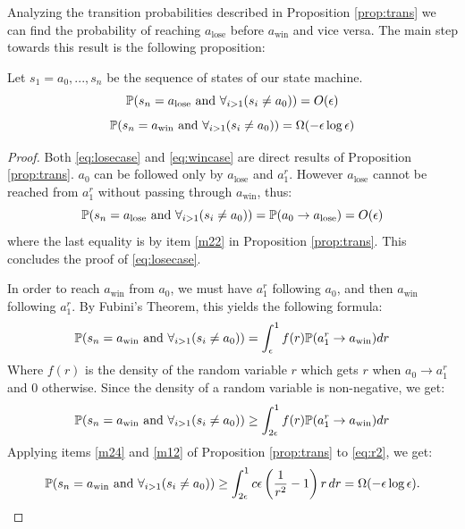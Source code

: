 {Analyzing the transition probabilities described in Proposition \ref{prop:trans} we
can find the probability of reaching $a_\text{lose}$ before $a_\text{win}$ and vice versa.
 The main step towards this result is the following proposition:

\begin{propos}\label{prop:winlose1}
Let $s_1=a_0,...,s_n$ be the sequence of states of our state machine.
\begin{equation}\label{eq:losecase}
\mathbb{P}(s_n=a_\text{lose} \text{ and } \displaystyle\forall_{i>1}(s_i\neq a_0))=O(\epsilon)
\end{equation}
\begin{equation}\label{eq:wincase}
\mathbb{P}(s_n=a_\text{win} \text{ and } \displaystyle\forall_{i>1}(s_i\neq a_0))=\Omega(-\epsilon\log\epsilon)
\end{equation}
\end{propos}

\begin{proof}
Both \eqref{eq:losecase} and \eqref{eq:wincase} are direct results of Proposition \ref{prop:trans}.
 $a_0$ can be followed only by $a_\text{lose}$ and $a_1^r$. However $a_\text{lose}$ cannot be
 reached from $a_1^r$ without passing through
 $a_\text{win}$, thus:
 $$\mathbb{P}(s_n=a_\text{lose} \text{ and } \displaystyle\forall_{i>1}(s_i\neq a_0))=\mathbb{P}(a_0\rightarrow a_\text{lose})=O(\epsilon)$$
 where the last equality is by item \ref{m22} in Proposition \ref{prop:trans}.
 This concludes the proof of \eqref{eq:losecase}.

 In order to reach $a_\text{win}$ from $a_0$, we must have $a_1^r$ following $a_0$, and then $a_\text{win}$
  following $a_1^r$. By Fubini's Theorem, this yields the following formula:
 \begin{equation}\label{eq:r1}
 \mathbb{P}(s_n=a_\text{win} \text{ and } \displaystyle\forall_{i>1}(s_i\neq a_0))=\displaystyle\int_{\epsilon}^1 f(r) \mathbb{P}(a^r_1\rightarrow a_\text{win}) dr
 \end{equation}
 Where $f(r)$ is the density of the random variable $r$ which gets $r$ when
 $a_0\rightarrow a^r_1$ and $0$ otherwise. Since the density of a random variable is non-negative, we get:
 \begin{equation}\label{eq:r2}
 \mathbb{P}(s_n=a_\text{win} \text{ and } \displaystyle\forall_{i>1}(s_i\neq a_0))\ge\displaystyle\int_{2\epsilon}^1 f(r) \mathbb{P}(a^r_1\rightarrow a_\text{win}) dr
 \end{equation}
Applying items \ref{m24} and \ref{m12} of Proposition \ref{prop:trans} to \eqref{eq:r2}, we get:
\begin{equation}\label{eq:r3}
 \mathbb{P}(s_n=a_\text{win} \text{ and } \displaystyle\forall_{i>1}(s_i\neq a_0))\ge \displaystyle\int_{2\epsilon}^1 c\epsilon\left(\frac{1}{r^2}-1\right)r\, dr = \Omega(-\epsilon\log\epsilon).
\end{equation}
\end{proof}

}
